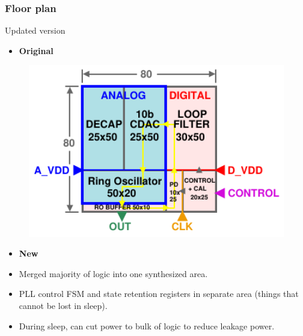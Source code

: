 \documentclass[t, screen, aspectratio=43]{beamer}
\begin{document}
\begin{frame}
	\frametitle{Floor plan}
	\begin{block}{Updated version}
		\begin{minipage}{6cm}
			\vspace{1em}
			\tiny
			\begin{itemize}[itemsep=4pt,label=\protect---]
				\item \textbf{Original}

			\end{itemize}

			\begin{figure}[htb!]
			        \centering
			        \includegraphics[width=1\textwidth, angle=0]{pll_floorplan}
			\end{figure}
		\end{minipage}%
		\begin{minipage}{6cm}
			\vspace{0.5em}
			\tiny
			\begin{itemize}[itemsep=4pt,label=\protect---]
				\item \textbf{New}
				\item Merged majority of logic into one synthesized area.
				\item PLL control FSM and state retention registers in separate area (things that cannot be lost in sleep).
				\item During sleep, can cut power to bulk of logic to reduce leakage power.
			\end{itemize}

\end{minipage}
\end{block}
\end{frame}
\end{document}
